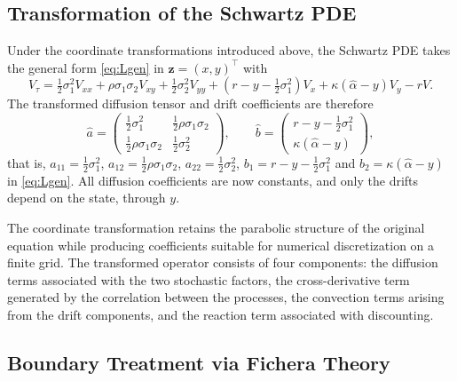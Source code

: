 \documentclass[12pt,a4paper]{article}
\begin{document}
\subsection{Transformation of the Schwartz PDE}

Under the coordinate transformations introduced above, the Schwartz PDE takes the general form \eqref{eq:Lgen} in $\mathbf{z}=(x,y)^\top$ with
\begin{equation}\label{eq:transformedPDE}
V_\tau=\tfrac12\sigma_1^2V_{xx}+\rho\sigma_1\sigma_2V_{xy}+\tfrac12\sigma_2^2V_{yy}+\left(r-y-\tfrac12\sigma_1^2\right)V_x+\kappa(\hat\alpha-y)V_y-rV.
\end{equation}
The transformed diffusion tensor and drift coefficients are therefore
\begin{equation}
\hat a=\begin{pmatrix}\tfrac12\sigma_1^2&\tfrac12\rho\sigma_1\sigma_2\\[2pt]\tfrac12\rho\sigma_1\sigma_2&\tfrac12\sigma_2^2\end{pmatrix},\qquad
\hat b=\begin{pmatrix}r-y-\tfrac12\sigma_1^2\\ \kappa(\hat\alpha-y)\end{pmatrix},
\end{equation}
that is, $a_{11}=\frac12\sigma_1^2$, $a_{12}=\frac12\rho\sigma_1\sigma_2$, $a_{22}=\frac12\sigma_2^2$, $b_1=r-y-\frac12\sigma_1^2$ and $b_2=\kappa(\hat\alpha-y)$ in \eqref{eq:Lgen}. All diffusion coefficients are now constants, and only the drifts depend on the state, through $y$.

The coordinate transformation retains the parabolic structure of the original equation while producing coefficients suitable for numerical discretization on a finite grid. The transformed operator consists of four components: the diffusion terms associated with the two stochastic factors, the cross-derivative term generated by the correlation between the processes, the convection terms arising from the drift components, and the reaction term associated with discounting.

\subsection{Boundary Treatment via Fichera Theory}\label{sec:fichera}
\end{document}
